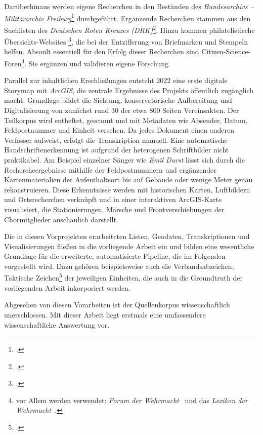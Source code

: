 \documentclass[12pt, a4paper, ngerman, bidi=default]{article}
\let\cite\footcite
\begin{document}
Darüberhinaus werden eigene Recherchen in den Beständen des \textit{Bundesarchivs -- Militärarchiv Freiburg}\cite{hollmann_freiburg_2025} durchgeführt. Ergänzende Recherchen 
stammen aus den Suchlisten des \textit{Deutschen Roten Kreuzes (DRK)}\cite{reuter_drk_2025}. Hinzu kommen philatelistische Übersichts-Websites \cite{noauthor_feldpost_nodate}, 
die bei der Entzifferung von Briefmarken und Stempeln helfen.
Absoult essentiell für den Erfolg dieser Recherchen sind Citizen-Science-Foren\footnote{vor Allem werden verwendet: 
\textit{Forum der Wehrmacht}~\parencite{hermans_forum_nodate} und das \textit{Lexikon der Wehrmacht}~\parencite{altenburger_lexikon_nodate}.}. Sie ergänzen und validieren eigene Forschung.

Parallel zur inhaltlichen Erschließungen entsteht 2022 eine erste digitale Storymap mit \textit{ArcGIS},
die zentrale Ergebnisse des Projekts öffentlich zugänglich macht. Grundlage bildet die Sichtung, konservatorische Aufbereitung und Digitalisierung
von zunächst rund 30 der etwa 800 Seiten Vereinsakten. Der Teilkorpus wird entheftet, gescannt und mit Metadaten wie Absender, Datum,
Feldpostnummer und Einheit versehen. Da jedes Dokument einen anderen Verfasser aufweist, erfolgt die Transkription manuell. Eine automatische Handschriftenerkennung 
ist aufgrund der heterogenen Schriftbilder nicht praktikabel.
Am Beispiel einzelner Sänger wie \textit{Emil Durst} lässt sich durch die Rechercheergebnisse mithilfe der Feldpostnummern und ergänzender Kartenmaterialien der Aufenthaltsort
bis auf Gebäude oder wenige Meter genau rekonstruieren. Diese Erkenntnisse werden mit historischen Karten, Luftbildern und Ortsrecherchen verknüpft
und in einer interaktiven ArcGIS-Karte visualisiert, die Stationierungen, Märsche und Frontverschiebungen der Chormitglieder anschaulich darstellt. 

Die in diesen Vorprojekten erarbeiteten Listen, Geodaten, Transkriptionen und Visualisierungen fließen in die vorliegende Arbeit ein
und bilden eine wesentliche Grundlage für die erweiterte, automatisierte Pipeline, die im Folgenden vorgestellt wird. Dazu gehören beispielsweise auch die Verbandsabzeichen, 
Taktische Zeichen\cite[vgl][S.64-66]{haupt_buch_1982} der jeweiligen Einheiten, die auch in die Groundtruth der vorliegenden Arbeit inkorporiert werden.

Abgesehen von diesen Vorarbeiten ist der Quellenkorpus wissenschaftlich unerschlossen. Mit dieser Arbeit liegt erstmals eine
umfassendere wissenschaftliche Auswertung vor.
\end{document}
